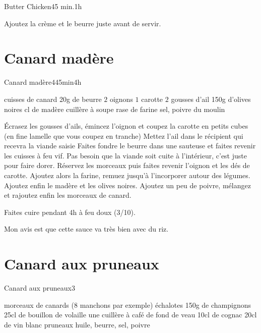 {\begin{recette}{Butter Chicken}{}{45 min.}{1h}
\begin{cuisson}
Ajoutez la crème et le beurre juste avant de servir.
\end{cuisson}
\end{recette}

\section{Canard madère}
\begin{recette}{Canard madère}{4}{45min}{4h}

\begin{ingredients}
 cuisses de canard
\ingredient 20g de beurre
\ingredient $2$ oignons
\ingredient $1$ carotte
\ingredient $2$ gousses d'ail
\ingredient 150g d'olives noires
 cl de madère
 cuillère à soupe rase de farine
\ingredient sel, poivre du moulin
\end{ingredients}

\begin{preparation}
\etape Écrasez les gousses d'ails, émincez l'oignon et coupez la carotte en petits cubes (en fine lamelle que vous coupez en 
tranche)
\etape Mettez l'ail dans le récipient qui recevra la viande saisie
\etape Faites fondre le beurre dans une sauteuse et faites revenir les cuisses à feu vif. Pas besoin que la viande soit cuite à l'intérieur, c'est juste pour faire dorer.
\etape Réservez les morceaux puis faites revenir l'oignon et les dés de carotte.
\etape Ajoutez alors la farine, remuez jusqu'à l'incorporer autour des légumes. Ajoutez enfin le madère et les olives noires. Ajoutez un peu de poivre, mélangez et rajoutez enfin les morceaux de canard.
\end{preparation}

\begin{cuisson}
Faites cuire pendant 4h à feu doux (3/10).
\end{cuisson}


\begin{remarque}
Mon avis est que cette sauce va très bien avec du riz.
\end{remarque}

\end{recette}

\section{Canard aux pruneaux}
\begin{recette}{Canard aux pruneaux}{3}{}{}
\begin{ingredients}
\ingredient morceaux de canards (8 manchons par exemple)
 échalotes
\ingredient 150g de champignons
\ingredient 25cl de bouillon de volaille
\ingredient une cuillère à café de fond de veau
\ingredient 10cl de cognac
\ingredient 20cl de vin blanc
\ingredient pruneaux
\ingredient huile, beurre, sel, poivre
\end{ingredients}


\end{recette}}
